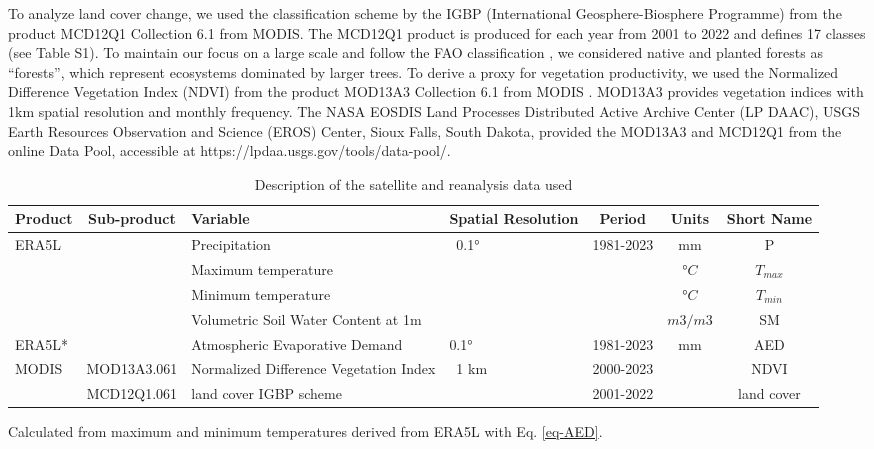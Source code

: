 \documentclass[
  authoryear,
  preprint,
  3p,
  onecolumn]{elsarticle}
\begin{document}
To analyze land cover change, we used the classification scheme by the
IGBP (International Geosphere-Biosphere Programme) from the product
MCD12Q1 Collection 6.1 from MODIS. The MCD12Q1 product is produced for
each year from 2001 to 2022 and defines 17 classes (see Table S1). To
maintain our focus on a large scale and follow the FAO classification
\citep{FAO2022}, we considered native and planted forests as
``forests'', which represent ecosystems dominated by larger trees. To
derive a proxy for vegetation productivity, we used the Normalized
Difference Vegetation Index (NDVI) from the product MOD13A3 Collection
6.1 from MODIS \citep{Didan2015}. MOD13A3 provides vegetation indices
with 1km spatial resolution and monthly frequency. The NASA EOSDIS Land
Processes Distributed Active Archive Center (LP DAAC), USGS Earth
Resources Observation and Science (EROS) Center, Sioux Falls, South
Dakota, provided the MOD13A3 and MCD12Q1 from the online Data Pool,
accessible at https://lpdaa.usgs.gov/tools/data-pool/.

\begin{table}[!ht]
\caption{Description of the satellite and reanalysis data used}
\label{tab-desEOD}
\scriptsize
\centering
\begin{tabular}{p{}cp{}p{}ccc}
\hline
\multirow{1}{*}{\centering Product} & Sub-product & Variable & Spatial Resolution  & Period & Units & Short Name \\ 
\hline
\multirow{4}{*}{ERA5L} & ~ & Precipitation & \multirow{4}{*}{~0.1°} & \multirow{4}{*}{1981-2023} & mm & P \\ 
         &  & Maximum temperature & ~ & & $°C$ & $T_{max}$ \\ 
         &  & Minimum temperature & ~ & & $°C$ & $T_{min}$ \\ 
         &  & Volumetric Soil Water Content at 1m & ~ & & $m3/m3$ & SM \\ 
ERA5L* & & Atmospheric Evaporative Demand & 0.1° & 1981-2023 & mm & AED \\
        \multirow{2}{*}{MODIS} & MOD13A3.061 & Normalized Difference Vegetation Index & \multirow{2}{*}{~1 km} & 2000-2023 & ~ & NDVI \\ 
         & MCD12Q1.061 & land cover IGBP scheme & & 2001-2022 & ~ & land cover \\ 
\hline
\end{tabular}
{\raggedright *Calculated from maximum and minimum temperatures derived from ERA5L with Eq. \ref{eq-AED}. \par}
\end{table}
\end{document}
